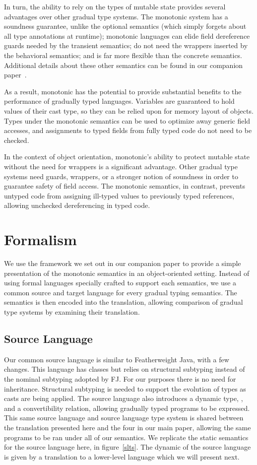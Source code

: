 \documentclass[sigconf]{acmart}
\begin{document}
In turn, the ability to rely on the types of mutable state 
provides several advantages over other gradual type systems. The monotonic
system has a soundness guarantee, unlike the optional semantics (which
simply forgets about all type annotations at runtime); monotonic languages
can elide field dereference guards needed by the transient semantics; do not
need the wrappers inserted by the behavioral semantics; and is far more
flexible than the concrete semantics. Additional details about these other
semantics can be found in our companion paper~\cite{us}.

As a result, monotonic has the potential to provide substantial benefits to
the performance of gradually typed languages. Variables are guaranteed to
hold values of their cast type, so they can be relied upon for memory layout
of objects. Types under the monotonic semantics can be used to optimize away
generic field accesses, and assignments to typed fields from fully typed
code do not need to be checked.

In the context of object orientation, monotonic's ability to protect mutable
state without the need for wrappers is a significant advantage. Other
gradual type systems need guards, wrappers, or a stronger notion of
soundness in order to guarantee safety of field access. The monotonic
semantics, in contrast, prevents untyped code from assigning ill-typed
values to previously typed references, allowing unchecked dereferencing in
typed code.

\section{Formalism}

We use the framework we set out in our companion paper to provide a simple
presentation of the monotonic semantics in an object-oriented setting. Instead
of using formal languages specially crafted to support each semantics, we use
a common source and target language for every gradual typing semantics. The 
semantics is then encoded into the translation, allowing comparison of gradual 
type systems by examining their translation.

\subsection{Source Language}

Our common source language is similar to Featherweight Java, with a few
changes. This language has classes but relies on structural subtyping
instead of the nominal subtyping adopted by FJ. For our purposes there is no
need for inheritance. Structural subtyping is needed to support the
evolution of types as casts are being applied. The source language also
introduces a dynamic type, \any, and a convertibility relation, allowing
gradually typed programs to be expressed. This same source language and
source language type system is shared between the translation presented here
and the four in our main paper, allowing the same programs to be ran under
all of our semantics. We replicate the static semantics for the source
language here, in figure~\ref{slts}. The dynamic of the source language is
given by a translation to a lower-level language which we will present next.
\end{document}

